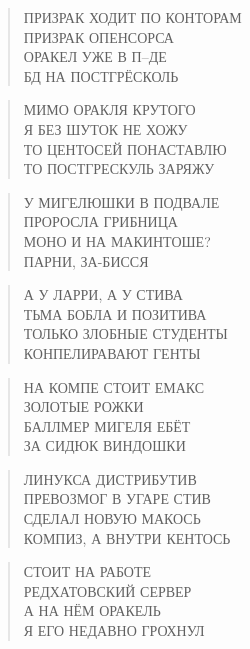 \poemtitle{***}
\begin{verse}
ПРИЗРАК ХОДИТ ПО КОНТОРАМ \\
ПРИЗРАК ОПЕНСОРСА\\
ОРАКЕЛ УЖЕ В П--ДЕ\\
БД НА ПОСТГРЁСКОЛЬ
\end{verse}

\poemtitle{***}
\begin{verse}
МИМО ОРАКЛЯ КРУТОГО\\
Я БЕЗ ШУТОК НЕ ХОЖУ\\
ТО ЦЕНТОСЕЙ ПОНАСТАВЛЮ\\
ТО ПОСТГРЕСКУЛЬ ЗАРЯЖУ
\end{verse}

\poemtitle{***}
\begin{verse}
У МИГЕЛЮШКИ В ПОДВАЛЕ\\
ПРОРОСЛА ГРИБНИЦА\\
МОНО И НА МАКИНТОШЕ?\\
ПАРНИ, ЗА-БИССЯ
\end{verse}

\poemtitle{***}
\begin{verse}
А У ЛАРРИ, А У СТИВА\\
ТЬМА БОБЛА И ПОЗИТИВА\\
ТОЛЬКО ЗЛОБНЫЕ СТУДЕНТЫ\\
КОНПЕЛИРАВАЮТ ГЕНТЫ
\end{verse}

\poemtitle{***}
\begin{verse}
НА КОМПЕ СТОИТ ЕМАКС\\
ЗОЛОТЫЕ РОЖКИ\\
БАЛЛМЕР МИГЕЛЯ ЕБЁТ\\
ЗА СИДЮК ВИНДОШКИ
\end{verse}

\poemtitle{***}
\begin{verse}
ЛИНУКСА ДИСТРИБУТИВ \\
ПРЕВОЗМОГ В УГАРЕ СТИВ\\
СДЕЛАЛ НОВУЮ МАКОСЬ\\
КОМПИЗ, А ВНУТРИ КЕНТОСЬ
\end{verse}

\poemtitle{***}
\begin{verse}
СТОИТ НА РАБОТЕ\\
РЕДХАТОВСКИЙ СЕРВЕР\\
А НА НЁМ ОРАКЕЛЬ\\
Я ЕГО НЕДАВНО ГРОХНУЛ
\end{verse}

